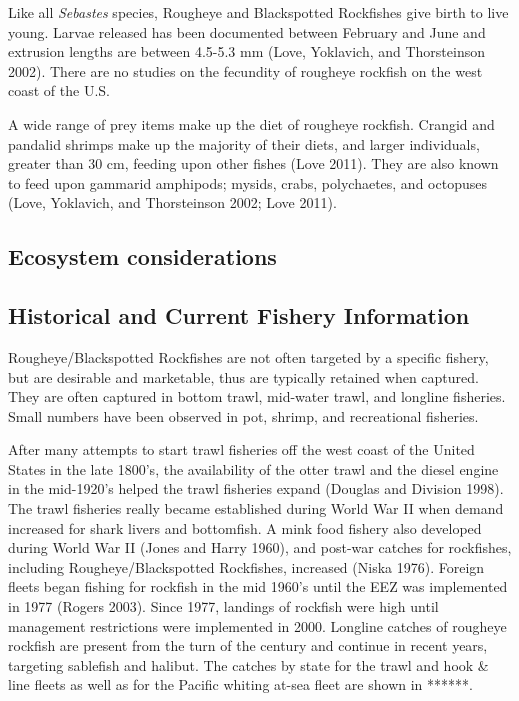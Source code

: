 \documentclass[
]{scrartcl}
\begin{document}
Like all \emph{Sebastes} species, Rougheye and Blackspotted Rockfishes
give birth to live young. Larvae released has been documented between
February and June and extrusion lengths are between 4.5-5.3 mm (Love,
Yoklavich, and Thorsteinson 2002). There are no studies on the fecundity
of rougheye rockfish on the west coast of the U.S.

A wide range of prey items make up the diet of rougheye rockfish.
Crangid and pandalid shrimps make up the majority of their diets, and
larger individuals, greater than 30 cm, feeding upon other fishes (Love
2011). They are also known to feed upon gammarid amphipods; mysids,
crabs, polychaetes, and octopuses (Love, Yoklavich, and Thorsteinson
2002; Love 2011).

\subsection{Ecosystem considerations}\label{ecosystem-considerations}

\subsection{Historical and Current Fishery
Information}\label{historical-and-current-fishery-information}

Rougheye/Blackspotted Rockfishes are not often targeted by a specific
fishery, but are desirable and marketable, thus are typically retained
when captured. They are often captured in bottom trawl, mid-water trawl,
and longline fisheries. Small numbers have been observed in pot, shrimp,
and recreational fisheries.

After many attempts to start trawl fisheries off the west coast of the
United States in the late 1800's, the availability of the otter trawl
and the diesel engine in the mid-1920's helped the trawl fisheries
expand (Douglas and Division 1998). The trawl fisheries really became
established during World War II when demand increased for shark livers
and bottomfish. A mink food fishery also developed during World War II
(Jones and Harry 1960), and post-war catches for rockfishes, including
Rougheye/Blackspotted Rockfishes, increased (Niska 1976). Foreign fleets
began fishing for rockfish in the mid 1960's until the EEZ was
implemented in 1977 (Rogers 2003). Since 1977, landings of rockfish were
high until management restrictions were implemented in 2000. Longline
catches of rougheye rockfish are present from the turn of the century
and continue in recent years, targeting sablefish and halibut. The
catches by state for the trawl and hook \& line fleets as well as for
the Pacific whiting at-sea fleet are shown in ******.
\end{document}
